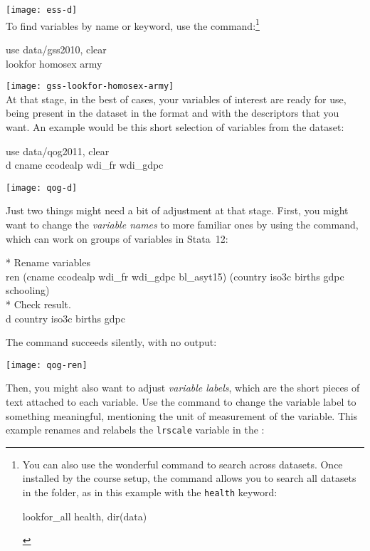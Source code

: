 \texttt{[image: ess-d]}\\[1em]

To find variables by name or keyword, use the  command:\footnote{You can also use the wonderful  command to search across datasets. Once installed by the course setup, the command allows you to search all datasets in the \data folder, as in this example with the \texttt{health} keyword:%
		\begin{docspec}
			lookfor\_all health, dir(data)
		\end{docspec}}\\[1em]

\begin{docspec}
	use data/gss2010, clear\\
	lookfor homosex army
\end{docspec}

\texttt{[image: gss-lookfor-homosex-army]}\\[1em]

At that stage, in the best of cases, your variables of interest are ready for use, being present in the dataset in the format and with the descriptors that you want. An example would be this short selection of variables from the \QOG dataset:

	\begin{docspec}
		use data/qog2011, clear\\
		d cname ccodealp wdi\_fr wdi\_gdpc
	\end{docspec}
	
	\texttt{[image: qog-d]}

Just two things might need a bit of adjustment at that stage. First, you might want to change the \emph{variable names} to more familiar ones by using the  command, which can work on groups of variables in Stata~12:

	\begin{docspec}
		* Rename variables\\
		ren (cname ccodealp wdi\_fr wdi\_gdpc bl\_asyt15) (country iso3c births gdpc schooling)\\
		* Check result.\\
		d country iso3c births gdpc
	\end{docspec}

The  command succeeds silently, with no output:

	\texttt{[image: qog-ren]}

%
Then, you might also want to adjust \emph{variable labels}, which are the short pieces of text attached to each variable. Use the  command to change the variable label to something meaningful, \eg mentioning the unit of measurement of the variable. This example renames and relabels the \texttt{lrscale} variable in the \ess:

